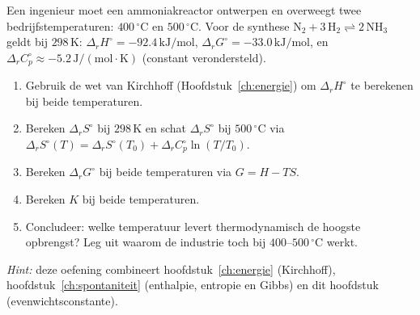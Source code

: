 \begin{oefening}
Een ingenieur moet een ammoniakreactor ontwerpen en overweegt twee bedrijfstemperaturen: \(400\,^\circ\mathrm{C}\) en \(500\,^\circ\mathrm{C}\). Voor de synthese \(\mathrm{N_2 + 3\,H_2 \rightleftharpoons 2\,NH_3}\) geldt bij \(298\,\mathrm{K}\): \(\Delta_r H^\circ = -92.4\,\mathrm{kJ/mol}\), \(\Delta_r G^\circ = -33.0\,\mathrm{kJ/mol}\), en \(\Delta_r C_p^\circ \approx -5.2\,\mathrm{J/(mol\cdot K)}\) (constant verondersteld).

\begin{enumerate}
\item[(a)]
  Gebruik de wet van Kirchhoff (Hoofdstuk~\ref{ch:energie}) om \(\Delta_r H^\circ\) te berekenen bij beide temperaturen.
\item[(b)]
  Bereken \(\Delta_r S^\circ\) bij \(298\,\mathrm{K}\) en schat \(\Delta_r S^\circ\) bij \(500\,^\circ\mathrm{C}\) via \(\Delta_r S^\circ(T) = \Delta_r S^\circ(T_0) + \Delta_r C_p^\circ \ln(T/T_0)\).
\item[(c)]
  Bereken \(\Delta_r G^\circ\) bij beide temperaturen via \(G = H - TS\).
\item[(d)]
  Bereken \(K\) bij beide temperaturen.
\item[(e)]
  Concludeer: welke temperatuur levert thermodynamisch de hoogste opbrengst? Leg uit waarom de industrie toch bij \(400\)--\(500\,^\circ\mathrm{C}\) werkt.
\end{enumerate}

\emph{Hint:} deze oefening combineert hoofdstuk~\ref{ch:energie} (Kirchhoff), hoofdstuk~\ref{ch:spontaniteit} (enthalpie, entropie en Gibbs) en dit hoofdstuk (evenwichtsconstante).
\end{oefening}

